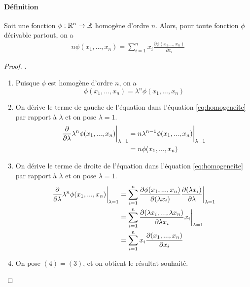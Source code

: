 \paragraph{Définition}
Soit une fonction $\phi : \mathbb{R}^n \rightarrow \mathbb{R}$ homogène d'ordre $n$. Alors, pour toute fonction $\phi$ dérivable partout, on a
\begin{align*}
n \phi(x_1, ..., x_n)  = \sum_{i=1}^{n} x_i \frac{\partial \phi(x_1, .., x_n)}{\partial x_i}
\end{align*}
\begin{proof}.
\begin{enumerate}[label=(\arabic*)]
\item Puisque $\phi$ est homogène d'ordre $n$, on a
\begin{equation}
\label{eq:homogeneite}
\phi(x_1, ..., x_n) = \lambda^n \phi(x_1, ..., x_n)
\end{equation}

\item On dérive le terme de gauche de l'équation dans l'équation \eqref{eq:homogeneite} par rapport à $\lambda$ et on pose $\lambda=1$.
\begin{align*}
\frac{\partial}{\partial \lambda} \lambda^n \phi(x_1, ..., x_n) \biggr \rvert_{\lambda=1} & = n \lambda^{n-1} \phi(x_1, ..., x_n) \biggr \rvert_{\lambda = 1} \\
	& = n \phi(x_1, ..., x_n) \\
\end{align*}

\item On dérive le terme de droite de l'équation dans l'équation \eqref{eq:homogeneite} par rapport à $\lambda$ et on pose $\lambda=1$.
\begin{align*}
\frac{\partial}{\partial \lambda} \lambda^n \phi(x_1, ..., x_n) \biggr \rvert_{\lambda=1} & = \sum_{i=1}^{n} \frac{\partial \phi(x_1, ..., x_n)}{\partial (\lambda x_i)} \frac{\partial (\lambda x_i) }{\partial \lambda} \biggr \rvert_{\lambda=1} \\ 
	& = \sum_{i=1}^{n} \frac{\partial ( \lambda x_i, ..., \lambda x_n)}{\partial \lambda x_i} x_i \biggr \rvert_{\lambda=1} \\	
	& = \sum_{i=1}^{n} x_i \frac{\partial (x_1, ..., x_n)}{\partial x_i} \\
\end{align*}
\item On pose $(4) = (3)$, et on obtient le résultat souhaité.
\end{enumerate}
\end{proof}


